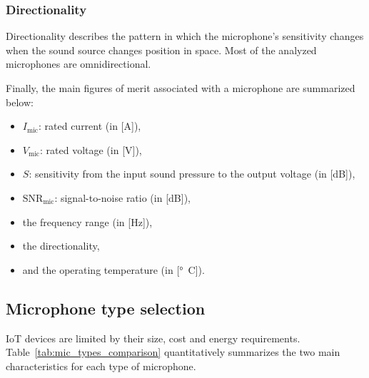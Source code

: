 \documentclass{EPL-master-thesis-covers-EN}
\newcommand{\te}[1]{\textrm{#1}}
\begin{document}

\subsubsection*{Directionality}

Directionality describes the pattern in which the microphone’s sensitivity changes when the sound source changes position in space. Most of the analyzed microphones are omnidirectional.


Finally, the main figures of merit associated with a microphone are summarized below:

\begin{itemize}
 \item $I_{\te{mic}}$: rated current (in [A]),
 \item $V_{\te{mic}}$: rated voltage (in [V]),
 \item $S$: sensitivity from the input sound pressure to the output voltage (in [dB]),
 \item $\te{SNR}_{\te{mic}}$: signal-to-noise ratio (in [dB]),
 \item the frequency range (in [Hz]),
 \item the directionality,
 \item and the operating temperature (in [\si{\degree C}]).
\end{itemize}


\subsection*{Microphone type selection}

IoT devices are limited by their size, cost and energy requirements. Table~\ref{tab:mic_types_comparison} quantitatively summarizes the two main characteristics for each type of microphone.

\begin{table}[H]
\centering
{}
\caption{Comparison of several types of microphone}
\label{tab:mic_types_comparison}
\end{table}
\end{document}
